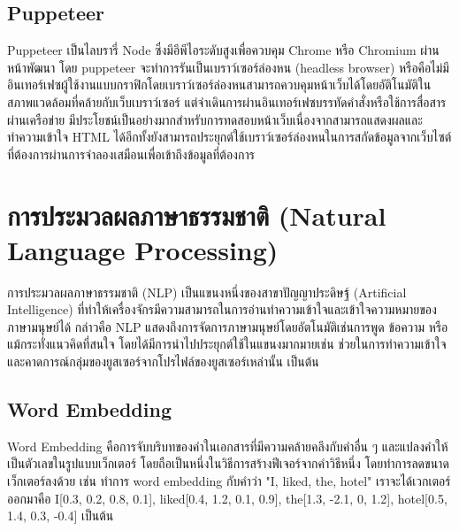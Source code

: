 \subsection{Puppeteer}
Puppeteer เป็นไลบรารี่ Node ซึ่งมีอีพีไอระดับสูงเพื่อควบคุม Chrome หรือ Chromium ผ่านหน้าพัฒนา โดย puppeteer จะทำการรันเป็นเบราว์เซอร์ล่องหน (headless browser) หรือคือไม่มีอินเทอร์เฟซผู้ใช้งานแบบกราฟิกโดยเบราว์เซอร์ล่องหนสามารถควบคุมหน้าเว็บได้โดยอัติโนมัติในสภาพแวดล้อมที่คล้ายกับเว็บเบราว์เซอร์ แต่จำเดินการผ่านอินเทอร์เฟซบรรทัดคำสั่งหรือใช้การสื่อสารผ่านเครือข่าย มีประโยชน์เป็นอย่างมากสำหรับการทดสอบหน้าเว็บเนื่องจากสามารถแสดงผลและทำความเข้าใจ HTML ได้อีกทั้งยังสามารถประยุกต์ใช้เบราว์เซอร์ล่องหนในการสกัดข้อมูลจากเว็บไซต์ที่ต้องการผ่านการจำลองเสมือนเพื่อเข้าถึงข้อมูลที่ต้องการ 


\section{การประมวลผลภาษาธรรมชาติ (Natural Language Processing)}
การประมวลผลภาษาธรรมชาติ (NLP) \cite{diego} เป็นแขนงหนึ่งของสาขาปัญญาประดิษฐ์ (Artificial Intelligence) ที่ทำให้เครื่องจักรมีความสามารถในการอ่านทำความเข้าใจและเข้าใจความหมายของภาษามนุษย์ได้ กล่าวคือ NLP แสดงถึงการจัดการภาษามนุษย์โดยอัตโนมัติเช่นการพูด ข้อความ หรือแม้กระทั่งแนวคิดที่สนใจ โดยได้มีการนำไปประยุกต์ใช้ในแขนงมากมายเช่น ช่วยในการทำความเข้าใจและคาดการณ์กลุ่มของยูสเซอร์จากโปรไฟล์ของยูสเซอร์เหล่านั้น เป็นต้น

\subsection{Word Embedding}
Word Embedding \cite{lukkiddd} คือการจับบริบทของคำในเอกสารที่มีความคล้ายคลึงกับคำอื่น ๆ และแปลงคำให้เป็นตัวเลขในรูปแบบเว็กเตอร์ โดยถือเป็นหนึ่งในวิธีการสร้างฟีเจอร์จากคำวิธีหนึ่ง โดยทำการลดขนาดเว็กเตอร์ลงด้วย เช่น ทำการ word embedding กับคำว่า "I, liked, the, hotel" เราจะได้เวกเตอร์ออกมาคือ I[0.3, 0.2, 0.8, 0.1], liked[0.4, 1.2, 0.1, 0.9], the[1.3, -2.1, 0, 1.2], hotel[0.5, 1.4, 0.3, -0.4] เป็นต้น


